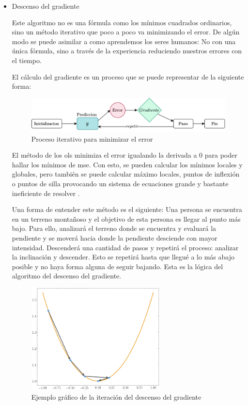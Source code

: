 \begin{itemize}
\item Descenso del gradiente

Este algoritmo no es una fórmula como los mínimos cuadrados ordinarios, sino un método iterativo que poco a poco va minimizando el error. De algún modo se puede asimilar a como aprendemos los seres humanos: No con una única fórmula, sino a través de la experiencia reduciendo nuestros errores con el tiempo.
\newline

El cálculo del gradiente es un proceso que se puede representar de la siguiente forma:
\begin{figure}[H]
    \centering
    \includegraphics[width=13cm]{images/state-of-art/gradient-descent/gradient-algorithm.png}
    \caption{Proceso iterativo para minimizar el error}
    \label{fig:gradient_descent}
\end{figure}

El método de los \acrshort{ols} minimiza el error igualando la derivada a $0$ para poder hallar los mínimos de \acrshort{mse}. Con esto, se pueden calcular los mínimos locales y globales, pero también se puede calcular máximo locales, puntos de inflexión o puntos de silla provocando un sistema de ecuaciones grande y bastante ineficiente de resolver \cite{papert}.
\newline

Una forma de entender este método es el siguiente: Una persona se encuentra en un terreno montañoso y el objetivo de esta persona es llegar al punto más bajo. Para ello, analizará el terreno donde se encuentra y evaluará la pendiente y se moverá hacia donde la pendiente desciende con mayor intensidad. Descenderá una cantidad de pasos y repetirá el proceso: analizar la inclinación y descender. Esto se repetirá hasta que llegué a lo más abajo posible y no haya forma alguna de seguir bajando. Esta es la lógica del algoritmo del descenso del gradiente.

\begin{figure}[H]
    \centering
    \includegraphics[width=7cm]{images/state-of-art/gradient-descent/gradient.png}
    \caption{Ejemplo gráfico de la iteración del descenso del gradiente}
    \label{fig:gradient_descent}
\end{figure}



\end{itemize}
